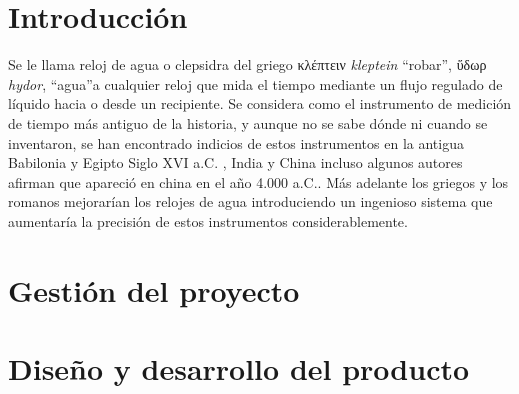 \chapter{Introducción}
  Se le llama reloj de agua o clepsidra \textemdash del griego \foreignlanguage{greek}{κλέπτειν} \textit{kleptein}
  ``robar'', \foreignlanguage{greek}{ὕδωρ} \textit{hydor}, ``agua''\textemdash a cualquier reloj que
  mida el tiempo mediante un flujo regulado de líquido hacia o
  desde un recipiente. Se considera como el instrumento de medición de tiempo
  más antiguo de la historia, y aunque no se sabe dónde ni cuando se
  inventaron, se han encontrado indicios de estos instrumentos en la antigua
  Babilonia y Egipto \textemdash Siglo XVI a.C. \textemdash, India y China \textemdash
  incluso algunos autores afirman que apareció en china en el año 4.000 a.C.\textemdash.
  Más adelante los griegos y los romanos mejorarían los relojes de agua introduciendo
  un ingenioso sistema que aumentaría la precisión de estos instrumentos considerablemente.\cite{clepsidra_wiki}




\chapter{Gestión del proyecto}







\chapter{Diseño y desarrollo del producto}

